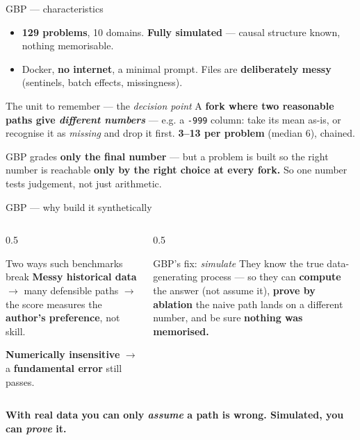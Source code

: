 \documentclass[9pt,aspectratio=169]{beamer}
\newcommand{\sm}[1]{{\color{unigrey}\small #1}}
\newcommand{\code}[1]{\texttt{\small #1}}
\begin{document}
\begin{frame}{GBP --- characteristics}
\begin{itemize}
  \item \textbf{129 problems}, 10 domains. \textbf{Fully simulated} --- causal structure known, nothing memorisable.
  \item Docker, \textbf{no internet}, a minimal prompt. Files are \textbf{deliberately messy} \sm{(sentinels, batch effects, missingness).}
\end{itemize}
\vfill
\begin{alertblock}{The unit to remember --- the \emph{decision point}}
A \textbf{fork where two reasonable paths give \emph{different numbers}} --- e.g. a \code{-999} column:
take its mean as-is, or recognise it as \emph{missing} and drop it first. \textbf{3--13 per problem} (median 6), chained.
\smallskip

GBP grades \textbf{only the final number} --- but a problem is built so the right number is reachable
\textbf{only by the right choice at every fork.} \sm{So one number tests judgement, not just arithmetic.}
\end{alertblock}
\end{frame}

\begin{frame}{GBP --- why build it synthetically}
\begin{columns}[T]
\begin{column}{0.5\textwidth}
\begin{alertblock}{Two ways such benchmarks break}
\footnotesize
\textbf{Messy historical data} $\to$ many defensible paths $\to$ the score measures the \textbf{author's
preference}, not skill.
\medskip

\textbf{Numerically insensitive} $\to$ a \textbf{fundamental error} still passes.
\end{alertblock}
\end{column}
\begin{column}{0.5\textwidth}
\begin{exampleblock}{GBP's fix: \emph{simulate}}
\footnotesize
They know the true data-generating process --- so they can \textbf{compute} the answer (not assume it),
\textbf{prove by ablation} the naive path lands on a different number, and be sure \textbf{nothing was memorised.}
\end{exampleblock}
\end{column}
\end{columns}
\vfill
\centering\textbf{With real data you can only \emph{assume} a path is wrong. Simulated, you can \emph{prove} it.}
\end{frame}
\end{document}
